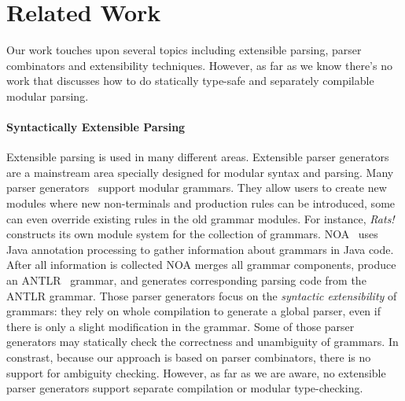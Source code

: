 \section{Related Work}\label{sec:relatedwork}

%
%
%
%

Our work touches upon several topics including extensible parsing,
parser combinators and extensibility techniques. However, as far as we
know there's no work that discusses how to do statically type-safe and 
separately compilable modular parsing.

\begin{comment}
There has been a
great amount of related papers on those topics. Some
inspired us of this paper and encourage us for more exploration. This
section will try to lead a discussion on what difference we have made.
\end{comment}

\paragraph{Syntactically Extensible Parsing} Extensible parsing is
used in many different areas. Extensible parser generators are a
mainstream area specially designed for modular syntax and
parsing. Many parser
generators~\cite{antlr1995,Grimm2006,Gouseti2014,Warth2016} support
modular grammars. They allow users to create new modules where new
non-terminals and production rules can be introduced, some can even
override existing rules in the old grammar modules. For instance,
\textit{Rats!}~\cite{Grimm2006} constructs its own module system for
the collection of grammars.  NOA~\cite{Gouseti2014} uses Java
annotation processing to gather information about grammars in Java
code. After all information is collected NOA merges all grammar
components, produce an ANTLR~\cite{} grammar, and generates
corresponding parsing code from the ANTLR grammar.  Those parser
generators focus on the \textit{syntactic extensibility} of grammars:
they rely on whole compilation to generate a global parser, even if
there is only a slight modification in the grammar. Some of those
parser generators may statically check the correctness and unambiguity
of grammars. In constrast, because our approach is based on parser
combinators, there is no support for ambiguity checking.  However, as
far as we are aware, no extensible parser generators support separate
compilation or modular type-checking.

